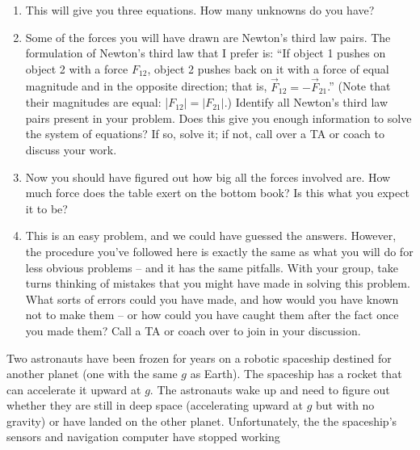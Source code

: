 \documentclass[12pt]{article}
\newcommand{\vsi}{\vspace{1in}}
\begin{document}
\begin{enumerate}
\vsi\vsi

\item This will give you three equations. How many unknowns do you have? 

\vsi

\item Some of the forces you will have drawn are Newton's third law pairs. The formulation of Newton's third law that I prefer is: ``If object 1 pushes on object 2 with a force $F_{12}$, object 2 pushes back on it with a force of 
equal magnitude and in the opposite direction; that is, $\vec F_{12} = - \vec F_{21}$.'' (Note that their magnitudes are equal: |$F_{12}|=|F_{21}|$.)  
Identify all Newton's third law pairs present in your problem. Does this give you enough information to solve the system of equations? If so, solve it; if not, call over a TA or coach to discuss your work.

\vsi\vsi\vsi\vsi

\item Now you should have figured out how big all the forces involved are. How much force does the table exert on the bottom book? Is this what you expect it to be?

\vsi
\newpage

\item This is an easy problem, and we could have guessed the answers. However, the procedure you've followed here is exactly the same as what you will do for less obvious problems -- and it has the same pitfalls. With your 
group, take turns thinking of mistakes that you might have made in solving this problem. What sorts of errors could you have made, and how would you have known not to make them -- or how could you have caught them after the
fact once you made them? Call a TA or coach over to join in your discussion.

\end{enumerate}

\newpage

\small

Two astronauts have been frozen for years on a robotic spaceship destined for another planet (one with the same $g$ as Earth). The spaceship has a rocket that can accelerate it upward at $g$. The astronauts wake up and need to figure out whether they are still in deep space (accelerating upward at $g$ but with no gravity) or have landed on the other planet. Unfortunately, the the spaceship's sensors and navigation computer have stopped working%
\end{document}
